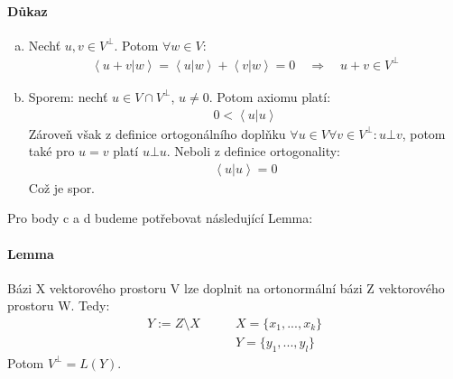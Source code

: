 \documentclass[a4paper,10pt]{article}
\begin{document}
\paragraph{Důkaz}
\begin{enumerate}[a)]
	\item Nechť $u, v \in V^\bot$. Potom $\forall w \in V$:
		\begin{align}
			\left< u + v | w \right> = \left< u | w \right> + \left< v | w
			\right> = 0 \quad \Rightarrow \quad u+v \in V^\bot
		\end{align}
	\item Sporem: nechť $u \in V\cap V^\bot$, $u \neq 0$. Potom axiomu platí:
		\begin{align}
			0 < \left< u | u \right>
		\end{align}
		Zároveň však z definice ortogonálního doplňku $\forall u \in V \forall v \in V^\bot: u \bot v$,
		potom také pro $u = v$ platí $u \bot u$. Neboli z definice ortogonality:
		\begin{align}
			\left< u | u \right> = 0
		\end{align}
		Což je spor.
\end{enumerate}
Pro body c a d budeme potřebovat následující Lemma:
\paragraph{Lemma} Bázi X vektorového prostoru V lze doplnit na ortonormální bázi
Z vektorového prostoru W. Tedy:
\begin{align}
	Y := Z \setminus X \qquad &X = \{x_1, ..., x_k\} \\
		& Y = \{y_1, ..., y_l\}
\end{align}
Potom $V^\bot = L(Y)$.
\end{document}
